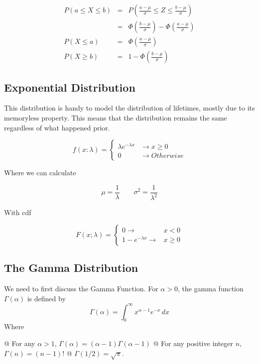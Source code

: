             \[
                \begin{aligned}
                    P(a \le X \le b) &=&  P\left( \frac{a - \mu}{\sigma} \le Z \le \frac{b - \mu}{\sigma} \right)\\
                                     &=& \Phi \left( \frac{b - \mu}{\sigma} \right) - \Phi \left( \frac{a - \mu}{\sigma} \right)\\
                    P(X \le a) &=& \Phi \left( \frac{a - \mu}{\sigma} \right)\\
                    P(X \ge b) &=& 1 - \Phi \left( \frac{b - \mu}{\sigma} \right)
                \end{aligned}
            \]

    \subsection{Exponential Distribution}
    This distribution is handy to model the distribution of lifetimes, mostly due to its memoryless property. This means
    that the distribution remains the same regardless of what happened prior.

        \[
            f(x:\lambda) =
            \begin{cases}
                \lambda e^{-\lambda x} &\to x \ge 0\\
                0 &\to Otherwise
            \end{cases}
        \]

    Where we can calculate

        \[ \mu = \frac{1}{\lambda} \qquad \sigma^2 = \frac{1}{\lambda^2} \]

    With cdf

        \[
            F(x; \lambda) =
            \begin{cases}
                0 \to& x < 0\\
                1 - e^{-\lambda x} \to& x \ge 0
            \end{cases}
        \]

    \subsection{The Gamma Distribution}
    We need to first discuss the Gamma Function. For $\alpha > 0$, the gamma function $\Gamma (\alpha)$ is defined by
        \[ \Gamma(\alpha) = \int^\infty_0 x^{\alpha - 1} e^{-x} \, dx \]
    Where
        \NewList
        \begin{easylist}
            @ For any $\alpha > 1$, $\Gamma(\alpha) = (\alpha - 1)\Gamma(\alpha - 1)$
            @ For any positive integer $n$, $\Gamma(n) = (n - 1)!$
            @ $\Gamma(1/2) = \sqrt{\pi}$.
        \end{easylist}

